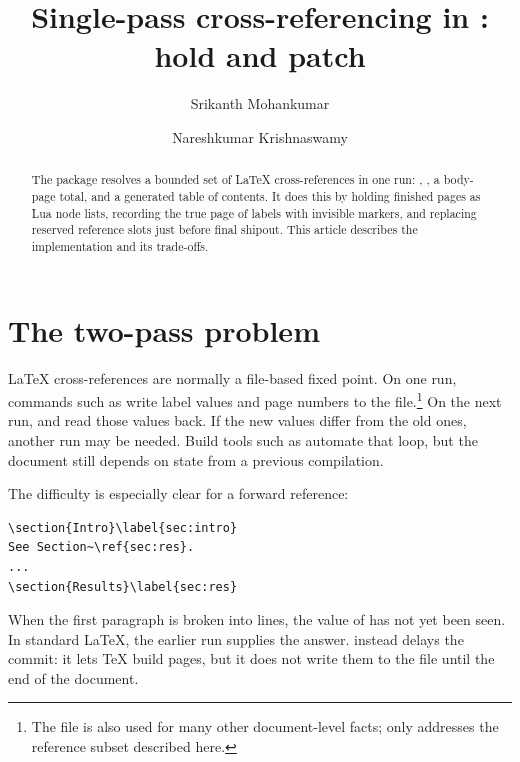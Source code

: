 \documentclass{ltugboat}
\title{Single-pass cross-referencing in \LuaLaTeX: hold and patch}
\author{Srikanth Mohankumar}
\author{Nareshkumar Krishnaswamy}
\begin{document}
\raggedbottom
\maketitle

\begin{abstract}
The  package resolves a bounded set of \LaTeX{}
cross-references in one \LuaLaTeX{} run: , , a
body-page total, and a generated table of contents.  It does this by
holding finished pages as Lua node lists, recording the true page of
labels with invisible markers, and replacing reserved reference slots
just before final shipout.  This article describes the implementation
and its trade-offs.
\end{abstract}

\section{The two-pass problem}

\LaTeX{} cross-references are normally a file-based fixed point.  On
one run, commands such as  write label values and page
numbers to the  file.\footnote{The  file is
also used for many other document-level facts;  only
addresses the reference subset described here.}  On the next run,
 and  read those values back.  If the new values
differ from the old ones, another run may be needed.  Build tools such as
 automate that loop, but the document still depends on
state from a previous compilation.

The difficulty is especially clear for a forward reference:
\begin{lstlisting}[style=monoreftex]
\section{Intro}\label{sec:intro}
See Section~\ref{sec:res}.
...
\section{Results}\label{sec:res}
\end{lstlisting}
When the first paragraph is broken into lines, the value of
 has not yet been seen.  In standard \LaTeX{}, the
earlier run supplies the answer.   instead delays the
commit: it lets \TeX{} build pages, but it does not write them to the
\PDF{} file until the end of the document.
\end{document}
